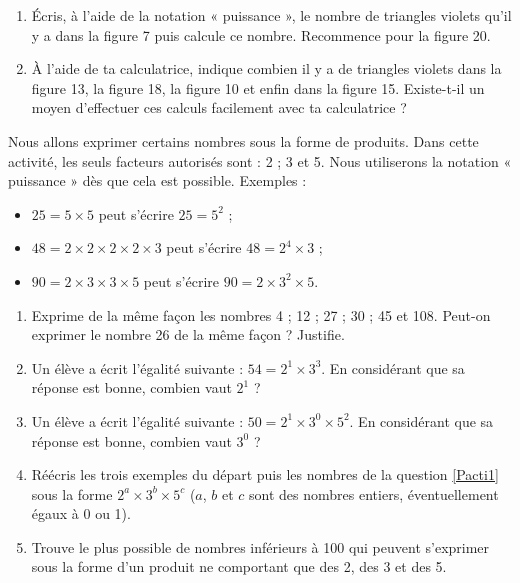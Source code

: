 \begin{activite}
\begin{partie}
\begin{itemize}
        
    \end{itemize}
     
\begin{enumerate}
\item Écris, à l'aide de la notation « puissance », le nombre de triangles violets qu'il y a dans la figure 7 puis calcule ce nombre. Recommence pour la figure 20.
\item À l'aide de ta calculatrice, indique combien il y a de triangles violets dans la figure 13, la figure 18, la figure 10 et enfin dans la figure 15. Existe-t-il un moyen d'effectuer ces calculs facilement avec ta calculatrice ?
\end{enumerate}
\end{partie}
 \end{activite}
 
 
\begin{activite}

\begin{partie}\label{PactiP1} Nous allons exprimer certains nombres sous la forme de produits. Dans cette activité, les seuls facteurs autorisés sont : 2 ; 3 et 5. Nous utiliserons la notation « puissance » dès que cela est possible.
Exemples :
        \begin{itemize}
        \item $25 = 5 \times 5$ peut s'écrire $25 = 5^2$ ;
		\item $48 = 2 \times 2 \times 2 \times 2 \times 3$ peut s'écrire $48 = 2^4 \times 3$ ;
		\item $90 = 2 \times 3 \times 3 \times 5$ peut s'écrire $90 = 2 \times 3^2 \times 5$.
		\end{itemize}
\begin{enumerate}
\item\label{Pacti1} Exprime de la même façon les nombres 4 ; 12 ; 27 ; 30 ; 45 et 108. Peut-on exprimer le nombre 26 de la même façon ? Justifie.
\item Un élève a écrit l'égalité suivante : $54 = 2^1 \times 3^3$. En considérant que sa réponse est bonne, combien vaut $2^1$ ?
\item Un élève a écrit l'égalité suivante : $50 = 2^1 \times 3^0 \times 5^2$. En considérant que sa réponse est bonne, combien vaut $3^0$ ?
\item Réécris les trois exemples du départ puis les nombres de la question \ref{Pacti1} sous la forme  $2^a \times 3^b \times 5^c$ ($a$, $b$ et $c$ sont des nombres entiers, éventuellement égaux à 0 ou 1).
\item\label{Pacti2} Trouve le plus possible de nombres inférieurs à 100 qui peuvent s'exprimer sous la forme d'un produit ne comportant que des 2, des 3 et des 5.
\end{enumerate}
\end{partie}



\end{activite}
